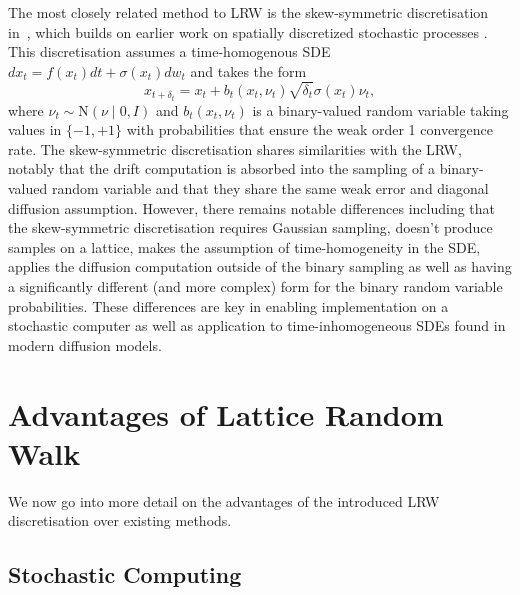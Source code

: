 \documentclass[pra,showpacs,amsmath,amssymb,amsfonts,lengthcheck,longbibliography,onecolumn]{revtex4-2}
\newcommand{\rb}[1]{{\color[RGB]{0, 100, 150}{RB: #1}}}
\begin{document}
The most closely related method to LRW is the skew-symmetric discretisation in~\cite{iguchi2024skew}, which builds on earlier work on spatially discretized stochastic processes \cite{bou2018continuous}.
This discretisation assumes a time-homogenous SDE $dx_t = f(x_t) dt + \sigma(x_t) dw_t$ and takes the form
\begin{equation*}
    x_{t+\delta_t} = x_t + b_t(x_t, \nu_t) \sqrt{\delta_t} \sigma(x_t) \nu_t,
\end{equation*}
where $\nu_t \sim \mathrm{N}(\nu \mid 0, I)$  and  $b_t(x_t, \nu_t)$
is a binary-valued random variable taking values in $\{-1, +1\}$ with probabilities
that ensure the weak order 1 convergence rate. The skew-symmetric discretisation
shares similarities with the LRW, notably that the drift computation is absorbed into the
sampling of a binary-valued random variable and that they share the same weak error and 
diagonal diffusion assumption. However, there remains notable differences including
that the skew-symmetric discretisation requires Gaussian sampling, doesn't produce
samples on a lattice, makes the assumption of time-homogeneity in the SDE, applies
the diffusion computation outside of the binary sampling as well as having a significantly
different (and more complex) form for the binary random variable probabilities.
These differences are key in enabling implementation on a stochastic computer
as well as application to time-inhomogeneous SDEs found in modern diffusion models.


\section{Advantages of Lattice Random Walk}\label{sec:advantages}

We now go into more detail on the advantages of the introduced LRW
discretisation over existing methods.

\subsection{Stochastic Computing}



\end{document}

